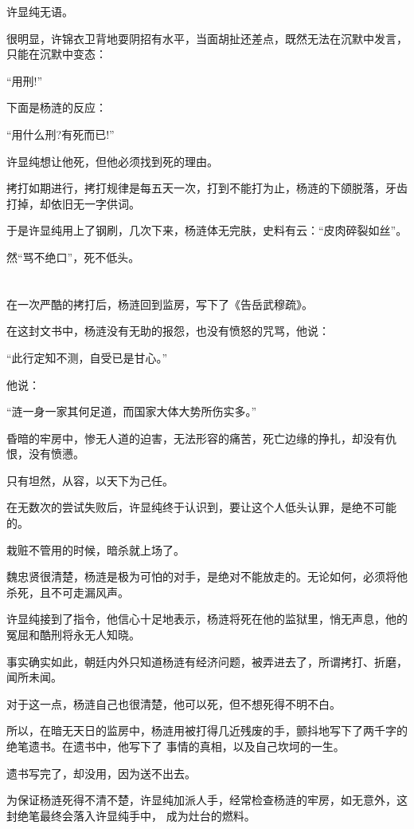 \documentclass[11pt,a4paper,onecolumn]{article}
\begin{document}
许显纯无语。

很明显，许锦衣卫背地耍阴招有水平，当面胡扯还差点，既然无法在沉默中发言，只能在沉默中变态：

``用刑!''

下面是杨涟的反应：

``用什么刑?有死而已!''

许显纯想让他死，但他必须找到死的理由。

拷打如期进行，拷打规律是每五天一次，打到不能打为止，杨涟的下颌脱落，牙齿打掉，却依旧无一字供词。

于是许显纯用上了钢刷，几次下来，杨涟体无完肤，史料有云：``皮肉碎裂如丝''。

然``骂不绝口''，死不低头。

\section[\thesection]{}

在一次严酷的拷打后，杨涟回到监房，写下了《告岳武穆疏》。

在这封文书中，杨涟没有无助的报怨，也没有愤怒的咒骂，他说：

``此行定知不测，自受已是甘心。''

他说：

``涟一身一家其何足道，而国家大体大势所伤实多。''

昏暗的牢房中，惨无人道的迫害，无法形容的痛苦，死亡边缘的挣扎，却没有仇恨，没有愤懑。

只有坦然，从容，以天下为己任。

在无数次的尝试失败后，许显纯终于认识到，要让这个人低头认罪，是绝不可能的。

栽赃不管用的时候，暗杀就上场了。

魏忠贤很清楚，杨涟是极为可怕的对手，是绝对不能放走的。无论如何，必须将他杀死，且不可走漏风声。

许显纯接到了指令，他信心十足地表示，杨涟将死在他的监狱里，悄无声息，他的冤屈和酷刑将永无人知晓。

事实确实如此，朝廷内外只知道杨涟有经济问题，被弄进去了，所谓拷打、折磨，闻所未闻。

对于这一点，杨涟自己也很清楚，他可以死，但不想死得不明不白。

所以，在暗无天日的监房中，杨涟用被打得几近残废的手，颤抖地写下了两千字的绝笔遗书。在遗书中，他写下了
事情的真相，以及自己坎坷的一生。

遗书写完了，却没用，因为送不出去。

为保证杨涟死得不清不楚，许显纯加派人手，经常检查杨涟的牢房，如无意外，这封绝笔最终会落入许显纯手中，
成为灶台的燃料。
\end{document}
